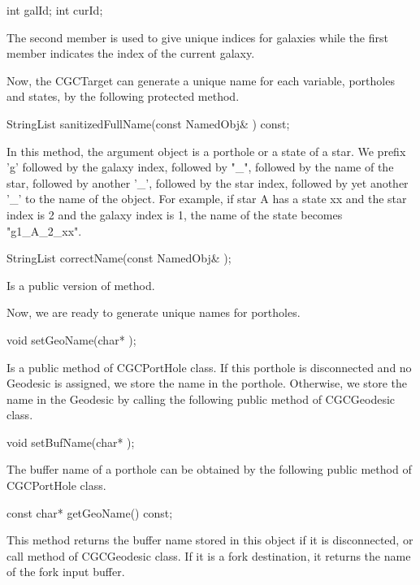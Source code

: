 {\begin{example}
int galId;
int curId;
\end{example}

The second member is used to give unique indices for galaxies while the
first member indicates the index of the current galaxy.

Now, the CGCTarget can generate a unique name for each variable,
portholes and states, by the following protected method.

\begin{example}
StringList sanitizedFullName(const NamedObj& ) const;
\end{example}

In this method, the argument object is a porthole or a state of a star.
We prefix 'g' followed by the galaxy index, followed by "_", followed
by the name of the star, followed by another '_', followed by the star
index, followed by yet another '_' to the name of the object. For example,
if star A has a state xx and the star index is 2 and the galaxy index is 1,
the name of the state becomes "g1_A_2_xx".

\begin{example}
StringList correctName(const NamedObj& );
\end{example}

Is a public version of  method.

Now, we are ready to generate unique names for portholes.

\begin{example}
void setGeoName(char* );
\end{example}

Is a public method of CGCPortHole class. If this porthole is disconnected
and no Geodesic is assigned, we store the name in the porthole. Otherwise,
we store the name in the Geodesic by calling the following public method
of CGCGeodesic class.

\begin{example}
void setBufName(char* );
\end{example}

The buffer name of a porthole can be obtained by the following public
method of CGCPortHole class.

\begin{example}
const char* getGeoName() const;
\end{example}

This method returns the buffer name stored in this object if it is
disconnected, or call  method of CGCGeodesic class.
If it is a fork destination, it returns the name of the fork input buffer.

}
